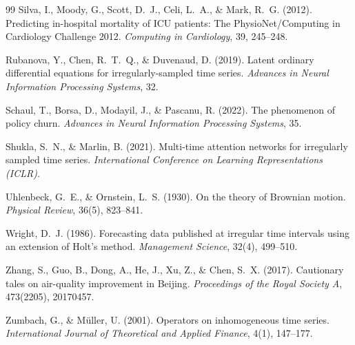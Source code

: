 \documentclass[11pt,a4paper]{article}
\begin{document}
\begin{thebibliography}{99}
Silva, I., Moody, G., Scott, D.~J., Celi, L.~A., \& Mark, R.~G. (2012).
\newblock Predicting in-hospital mortality of ICU patients: The PhysioNet/Computing in Cardiology Challenge 2012.
\newblock \emph{Computing in Cardiology}, 39, 245--248.

Rubanova, Y., Chen, R.~T.~Q., \& Duvenaud, D. (2019).
\newblock Latent ordinary differential equations for irregularly-sampled time
  series.
\newblock \emph{Advances in Neural Information Processing Systems}, 32.

Schaul, T., Borsa, D., Modayil, J., \& Pascanu, R. (2022).
\newblock The phenomenon of policy churn.
\newblock \emph{Advances in Neural Information Processing Systems}, 35.

Shukla, S.~N., \& Marlin, B. (2021).
\newblock Multi-time attention networks for irregularly sampled time series.
\newblock \emph{International Conference on Learning Representations (ICLR)}.

Uhlenbeck, G.~E., \& Ornstein, L.~S. (1930).
\newblock On the theory of Brownian motion.
\newblock \emph{Physical Review}, 36(5), 823--841.

Wright, D.~J. (1986).
\newblock Forecasting data published at irregular time intervals using an
  extension of Holt's method.
\newblock \emph{Management Science}, 32(4), 499--510.

Zhang, S., Guo, B., Dong, A., He, J., Xu, Z., \& Chen, S.~X. (2017).
\newblock Cautionary tales on air-quality improvement in Beijing.
\newblock \emph{Proceedings of the Royal Society A}, 473(2205), 20170457.

Zumbach, G., \& M\"uller, U. (2001).
\newblock Operators on inhomogeneous time series.
\newblock \emph{International Journal of Theoretical and Applied Finance},
  4(1), 147--177.

\end{thebibliography}
\end{document}
